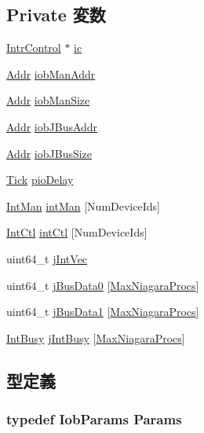 \subsection*{Private 変数}
\begin{DoxyCompactItemize}
\item 
\hyperlink{classIntrControl}{IntrControl} $\ast$ \hyperlink{classIob_acd432c3316af2e694733cb3ca5b57bb4}{ic}
\item 
\hyperlink{base_2types_8hh_af1bb03d6a4ee096394a6749f0a169232}{Addr} \hyperlink{classIob_a5b9c2a6c7833c638ac7f48f8d40d8826}{iobManAddr}
\item 
\hyperlink{base_2types_8hh_af1bb03d6a4ee096394a6749f0a169232}{Addr} \hyperlink{classIob_a70272f6df3d88fc8934351dda059264a}{iobManSize}
\item 
\hyperlink{base_2types_8hh_af1bb03d6a4ee096394a6749f0a169232}{Addr} \hyperlink{classIob_aba44ac2ddf6078b6b3f990a68892272c}{iobJBusAddr}
\item 
\hyperlink{base_2types_8hh_af1bb03d6a4ee096394a6749f0a169232}{Addr} \hyperlink{classIob_afce8ffd48792d932bbadab4bc5a0a158}{iobJBusSize}
\item 
\hyperlink{base_2types_8hh_a5c8ed81b7d238c9083e1037ba6d61643}{Tick} \hyperlink{classIob_ac8e969635a78ab9ab123904ccca434cc}{pioDelay}
\item 
\hyperlink{structIob_1_1IntMan}{IntMan} \hyperlink{classIob_a5ecb750ae20ab06b89d17e596ae2725b}{intMan} \mbox{[}NumDeviceIds\mbox{]}
\item 
\hyperlink{structIob_1_1IntCtl}{IntCtl} \hyperlink{classIob_af459816a17b687878d7d0f971c3af98e}{intCtl} \mbox{[}NumDeviceIds\mbox{]}
\item 
uint64\_\-t \hyperlink{classIob_a46f4284ddac54035615f6ae5dd274949}{jIntVec}
\item 
uint64\_\-t \hyperlink{classIob_a879d3a735fb02cc428ac1a00bd6ca1cd}{jBusData0} \mbox{[}\hyperlink{iob_8hh_ad25d74b9f417cfb77620cab3183e0aba}{MaxNiagaraProcs}\mbox{]}
\item 
uint64\_\-t \hyperlink{classIob_adb2d55598e0489de9fe265747a544686}{jBusData1} \mbox{[}\hyperlink{iob_8hh_ad25d74b9f417cfb77620cab3183e0aba}{MaxNiagaraProcs}\mbox{]}
\item 
\hyperlink{structIob_1_1IntBusy}{IntBusy} \hyperlink{classIob_a971401f936f065a7781d41a2cf198303}{jIntBusy} \mbox{[}\hyperlink{iob_8hh_ad25d74b9f417cfb77620cab3183e0aba}{MaxNiagaraProcs}\mbox{]}
\end{DoxyCompactItemize}


\subsection{型定義}
\hypertarget{classIob_a177ee3cfebf080ab43aa1b8310f520b1}{
\subsubsection[{Params}]{\setlength{\rightskip}{0pt plus 5cm}typedef IobParams {\bf Params}}}
\label{classIob_a177ee3cfebf080ab43aa1b8310f520b1}


